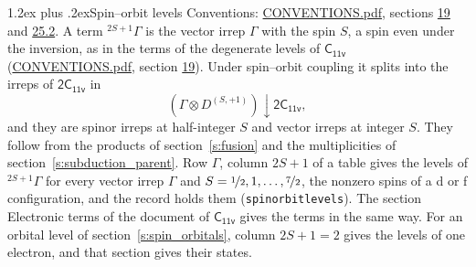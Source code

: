 \documentclass[10pt,a4paper]{article}
\makeatletter
\renewcommand\section{\@startsection{section}{1}{\z@}{-3ex plus -1ex minus -.2ex}%
  {1.2ex plus .2ex}{\normalfont\large\sffamily\bfseries\color{parttitle}}}
\numberwithin{equation}{section}
\newcommand{\grp}[1]{\mathsf{#1}}
\newcommand{\restr}[2]{#1\!\downarrow#2}
\newcommand{\irrJp}[2]{D^{(#1,#2)}}
\newcommand{\irrprod}{\otimes}
\newcommand{\term}[2]{{}^{#1}#2}
\makeatother
\begin{document}
\section{Spin--orbit levels}\label{s:spin_orbit}
Conventions: \href{../../CONVENTIONS.pdf}{CONVENTIONS.pdf}, sections \href{../../../rotation/CONVENTIONS.pdf\#conv.19}{19} and \href{../../CONVENTIONS.pdf\#conv.25.2}{25.2}.
\leavevmode\label{n:local.spin}\label{n:symbol.term}A term $\term{2S+1}{\Gamma}$ is the vector irrep $\Gamma$ with the spin $S$, a spin even under the inversion, as in the terms of the degenerate levels of \href{../../../rotation/data/pdf/C11v.pdf}{$\grp{C_{11v}}$} (\href{../../CONVENTIONS.pdf}{CONVENTIONS.pdf}, section \href{../../../rotation/CONVENTIONS.pdf\#conv.19}{19}). Under spin--orbit coupling it splits into the irreps of $\grp{2C_{11v}}$ in
\begin{equation}\label{e:spinorbit}\restr{(\Gamma \irrprod \irrJp{S}{+1})}{\grp{2C_{11v}}},\end{equation}
and they are spinor irreps at half-integer $S$ and vector irreps at integer $S$. They follow from the products of section~\ref{s:fusion} and the multiplicities of section~\ref{s:subduction_parent}. Row $\Gamma$, column $2S + 1$ of a table gives the levels of $\term{2S+1}{\Gamma}$ for every vector irrep $\Gamma$ and $S = \nicefrac{1}{2}, 1, \dots, \nicefrac{7}{2}$, the nonzero spins of a d or f configuration, and the record holds them (\texttt{spinorbitlevels}). The section Electronic terms of the document of \href{../../../rotation/data/pdf/C11v.pdf}{$\grp{C_{11v}}$} gives the terms in the same way. For an orbital level of section~\ref{s:spin_orbitals}, column $2S + 1 = 2$ gives the levels of one electron, and that section gives their states.
\end{document}
